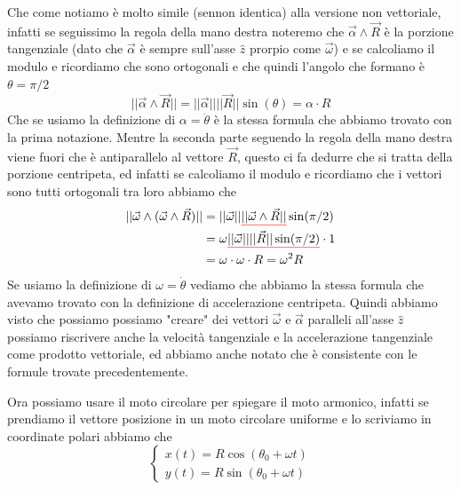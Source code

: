 \documentclass{rapport}
\def\mathunderline#1#2{\color{#1}\underline{{\color{black}#2}}\color{black}}
\begin{document}
Che  come notiamo è molto simile (sennon identica) alla versione non vettoriale, infatti se seguissimo la regola della mano destra noteremo che $ \vec{\alpha}  \wedge \vec{R}$ è la porzione tangenziale (dato che $\vec{\alpha}$ è sempre sull'asse $\hat{z}$ prorpio come $\vec{\omega}$) e se calcoliamo il modulo e ricordiamo che sono ortogonali e che quindi l'angolo che formano è $\theta = \pi/2$
\[
||\vec{\alpha} \wedge \vec{R}|| = ||\vec{\alpha} ||||\vec{R}|| \sin(\theta) = \alpha \cdot R
\]
Che se usiamo la definizione di $\alpha = \ddot{\theta}$ è la stessa formula che abbiamo trovato con la prima notazione. Mentre la seconda parte seguendo la regola della mano destra viene fuori che è antiparallelo al vettore $\vec{R}$, questo ci fa dedurre che si tratta della porzione centripeta, ed infatti se calcoliamo il modulo e ricordiamo che i vettori sono tutti ortogonali tra loro abbiamo che
\begin{align*}
||\vec{\omega} \wedge(\vec{\omega} \wedge \vec{R}) || &= || \vec{\omega}  || \mathunderline{red}{||\vec{\omega} \wedge \vec{R} ||} \sin(\pi/2)\\
&=\omega \mathunderline{red}{||\vec{\omega}  |||| \vec{R} || \sin(\pi/2)} \cdot 1 \\
&= \omega \cdot \omega \cdot R = \omega^2 R
\end{align*}
Se usiamo la definizione di $\omega = \dot{\theta}$ vediamo che abbiamo la stessa formula che avevamo trovato con la definizione di accelerazione centripeta. Quindi abbiamo visto che possiamo possiamo "creare" dei vettori $\vec{\omega}$ e $\vec{\alpha}$ paralleli all'asse $\hat{z}$ possiamo riscrivere anche la velocità tangenziale e la accelerazione tangenziale come prodotto vettoriale, ed abbiamo anche notato che è consistente con le formule trovate precedentemente.  


\newpage

Ora possiamo usare il moto circolare per spiegare il moto armonico, infatti se prendiamo il vettore posizione in un moto circolare uniforme e lo scriviamo in coordinate polari abbiamo che 
\[
\begin{cases}
  x(t) = R\cos(\theta_0 + \omega t) \\
  y(t) = R\sin(\theta_0 + \omega t)
\end{cases}
\]
\end{document}
